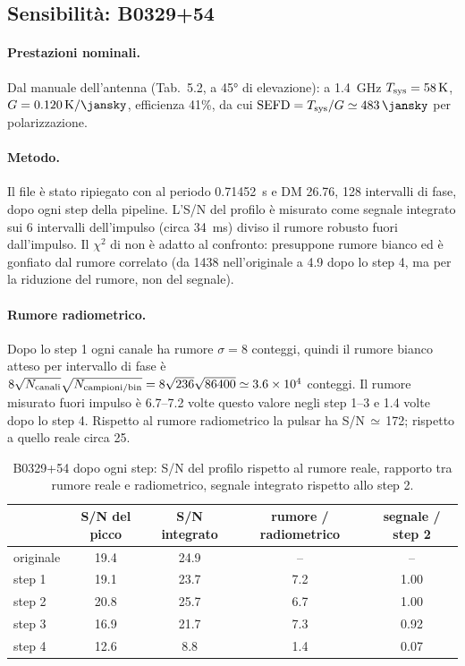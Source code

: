 \subsection{Sensibilità: B0329+54}
\label{sec:b0329}

\paragraph{Prestazioni nominali.} Dal manuale dell'antenna (Tab.~5.2, a \ang{45} di elevazione): a
\SI{1.4}{\giga\hertz} $T_{\rm sys}=\SI{58}{\kelvin}$, $G=\SI{0.120}{\kelvin\per\jansky}$, efficienza 41\%, da cui
$\text{SEFD}=T_{\rm sys}/G\simeq\SI{483}{\jansky}$ per polarizzazione.

\paragraph{Metodo.} Il file  è stato ripiegato con  al periodo
\SI{0.71452}{\second} e DM 26.76, 128 intervalli di fase, dopo ogni step della pipeline. L'S/N del profilo è misurato
come segnale integrato sui 6 intervalli dell'impulso (circa \SI{34}{\milli\second}) diviso il rumore robusto fuori
dall'impulso. Il $\chi^2$ di  non è adatto al confronto: presuppone rumore bianco ed è gonfiato dal
rumore correlato (da 1438 nell'originale a 4.9 dopo lo step 4, ma per la riduzione del rumore, non del segnale).

\paragraph{Rumore radiometrico.} Dopo lo step 1 ogni canale ha rumore $\sigma=8$ conteggi, quindi il rumore bianco
atteso per intervallo di fase è $8\sqrt{N_{\rm canali}}\sqrt{N_{\rm campioni/bin}}=8\sqrt{236}\sqrt{86400}\simeq
\num{3.6e4}$ conteggi. Il rumore misurato fuori impulso è 6.7--7.2 volte questo valore negli step 1--3 e 1.4 volte
dopo lo step 4. Rispetto al rumore radiometrico la pulsar ha S/N\,$\simeq$\,172; rispetto a quello reale circa 25.

\begin{table}[ht]
\centering
\caption{B0329+54 dopo ogni step: S/N del profilo rispetto al rumore reale, rapporto tra rumore reale e radiometrico,
segnale integrato rispetto allo step 2.}
\label{tab:b0329}
\small
\begin{tabular}{lcccc}
\toprule
 & S/N del picco & S/N integrato & rumore / radiometrico & segnale / step 2 \\
\midrule
originale & 19.4 & 24.9 & -- & -- \\
step 1 & 19.1 & 23.7 & 7.2 & 1.00 \\
step 2 & 20.8 & 25.7 & 6.7 & 1.00 \\
step 3 & 16.9 & 21.7 & 7.3 & 0.92 \\
step 4 & 12.6 & 8.8 & 1.4 & 0.07 \\
\bottomrule
\end{tabular}
\end{table}

